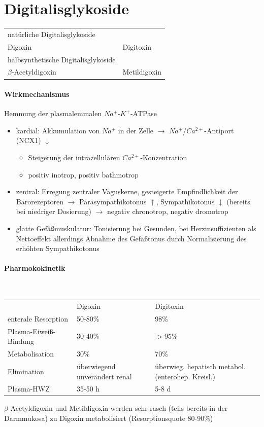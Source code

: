 \documentclass[10pt,a4paper]{report}
\begin{document}
\section{Digitalisglykoside}
\begin{tabularx}{\textwidth}{XX}
natürliche Digitalisglykoside&\\
Digoxin&Digitoxin\\
halbsynthetische Digitalisglykoside&\\
$\beta$-Acetyldigoxin&Metildigoxin\\
\end{tabularx}
\paragraph{Wirkmechanismus}
Hemmung der plasmalemmalen $Na^+$-$K^+$-ATPase 
\begin{itemize}
	\item kardial: Akkumulation von $Na^+$ in der Zelle $\rightarrow$ $Na^+$/$Ca^{2+}$-Antiport (NCX1) $\downarrow$
	\begin{itemize}
		\item Steigerung der intrazellulären $Ca^{2+}$-Konzentration 
		\item positiv inotrop, positiv bathmotrop
	\end{itemize}
	\item zentral: Erregung zentraler Vaguskerne, gesteigerte Empfindlichkeit der Barorezeptoren $\rightarrow$ Parasympathikotonus $\uparrow$, Sympathikotonus $\downarrow$ (bereits bei niedriger Dosierung)	$\rightarrow$ negativ chronotrop, negativ dromotrop
	\item glatte Gefäßmuskulatur: Tonisierung bei Gesunden, bei Herzinsuffizienten als Nettoeffekt allerdings Abnahme des Gefäßtonus durch Normalisierung des erhöhten Sympathikotonus
\end{itemize}
\paragraph{Pharmokokinetik} \mbox{} \\
\begin{tabularx}{\textwidth}{XXX}
&Digoxin&Digitoxin\\
enterale Resorption	&50-80\%&98\%\\
Plasma-Eiweiß-Bindung&30-40\%&$>$95\%\\
Metabolisation&30\%&70\%\\
Elimination&überwiegend unverändert renal&überwieg. hepatisch metabol. (enterohep. Kreisl.) \\
Plasma-HWZ&35-50 h&5-8 d\\
\end{tabularx}
$\beta$-Acetyldigoxin und Metildigoxin werden sehr rasch (teils bereits in der Darmmukosa) zu Digoxin metabolisiert (Resorptionsquote 80-90\%)
\end{document}
